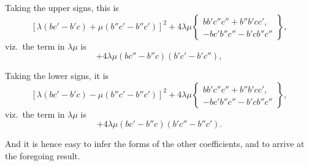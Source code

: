 \documentclass[11pt,a4paper]{article}
\theoremstyle{plain}
\theoremstyle{definition}
\begin{document}
Taking the upper signs, this is
\[
[\lambda (bc' - b'c) + \mu (b''c' - b''c')]^2 + 4\lambda\mu \left\{ \begin{array}{l} bb'c''c'' + b''b'cc', \\ -bc'b''c'' - b'cb''c'' \end{array} \right\},
\]
viz.\ the term in $\lambda\mu$ is
\[
+ 4\lambda\mu (bc'' - b''c)(b'c' - b'c''),
\]

Taking the lower signs, it is
\[
[\lambda (bc' - b'c) - \mu (b''c' - b''c')]^2 + 4\lambda\mu \left\{ \begin{array}{l} bb'c''c'' + b''b'cc', \\ -bc'b''c'' - b'cb''c'' \end{array} \right\},
\]
viz.\ the term in $\lambda\mu$ is
\[
+ 4\lambda\mu (bc' - b''c)(b'c'' - b''c').
\]

And it is hence easy to infer the forms of the other coefficients, and to arrive at the foregoing result.

\clearpage
\end{document}

